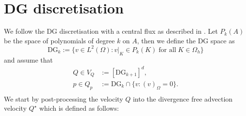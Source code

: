 \documentclass[11pt]{article}
\begin{document}
\section{DG discretisation}
We follow the DG discretisation with a central flux as described in \cite{Guzman2016}. Let $P_k(A)$ be the space of polynomials of degree $k$ on $A$, then we define the DG space as
\begin{equation}
    \text{DG}_k := \{ v\in L^2(\Omega) : v|_K \in P_k(K) \;\text{for all}\;K\in \Omega_h \}
\end{equation}
and assume that
\begin{equation}
    \begin{aligned}
        Q \in V_Q & := [\text{DG}_{k+1}]^d,                    \\
        p \in Q_p & := \text{DG}_{k}\cap \{v:(v)_{\Omega}=0\}. \\
    \end{aligned}
\end{equation}
We start by post-processing the velocity $Q$ into the divergence free advection velocity $Q^\star$ which is defined as follows:
\end{document}
